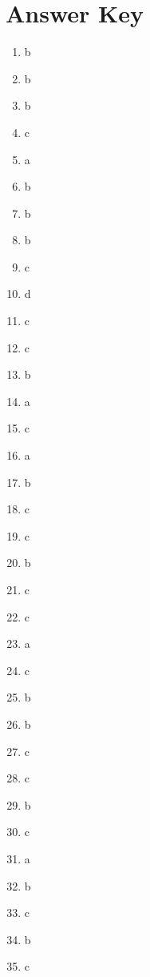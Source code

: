\documentclass[11pt]{article}
\begin{document}
\section*{Answer Key}
\begin{enumerate}[leftmargin=*, label=\textbf{\arabic*.}]
\item b
\item b
\item b
\item c
\item a
\item b
\item b
\item b
\item c
\item d
\item c
\item c
\item b
\item a
\item c
\item a
\item b
\item c
\item c
\item b
\item c
\item c
\item a
\item c
\item b
\item b
\item c
\item c
\item b
\item c
\item a
\item b
\item c
\item b
\item c
\end{enumerate}
\fi
\end{document}
